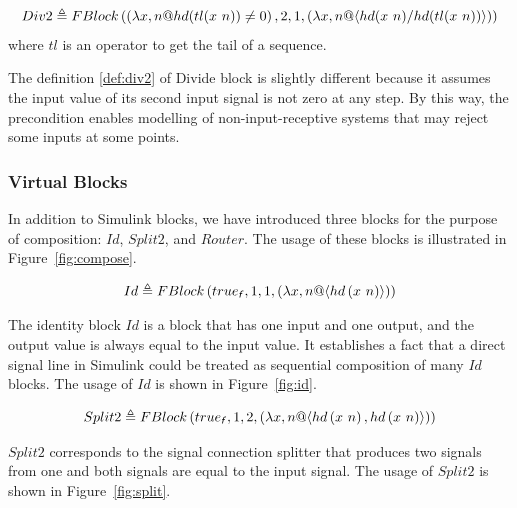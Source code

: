 \begin{definition} \label{def:div2}
    \begin{align*}
        Div2 \triangleq FBlock\left( \left(\lambda x, n @ hd(tl(x~n)) \neq 0\right), 2, 1, \left(\lambda x, n @ \langle hd(x~n)/hd(tl(x~n))\rangle\right)\right) 
    \end{align*}
    where $tl$ is an operator to get the tail of a sequence.
\end{definition}
The definition \ref{def:div2} of Divide block is slightly different because it assumes the input value of its second input signal is not zero at any step. By this way, the precondition enables modelling of non-input-receptive systems that may reject some inputs at some points. %

\subsubsection{Virtual Blocks}
In addition to Simulink blocks, we have introduced three blocks for the purpose of composition: $Id$, $Split2$, and $Router$. The usage of these blocks is illustrated in Figure~\ref{fig:compose}.

\begin{definition}[Id] \label{def:id}
    \begin{align*}
        Id \defs FBlock\left( \logtrue{f}, 1, 1, \left(\lambda x, n @ \langle hd\left(x~n\right)\rangle\right)\right) 
    \end{align*}
\end{definition}
The identity block $Id$ is a block that has one input and one output, and the output value is always equal to the input value. It establishes a fact that a direct signal line in Simulink could be treated as sequential composition of many $Id$ blocks. The usage of $Id$ is shown in Figure~\ref{fig:id}.

\begin{definition}[Split2]  \label{def:split2}
    \begin{align*}
        Split2 \defs FBlock\left( \logtrue{f}, 1, 2, \left(\lambda x, n @ \langle hd\left(x~n\right), hd\left(x~n\right)\rangle\right)\right) 
    \end{align*}
\end{definition}
$Split2$ corresponds to the signal connection splitter that produces two signals from one and both signals are equal to the input signal. The usage of $Split2$ is shown in Figure~\ref{fig:split}.

